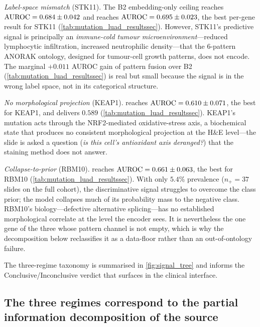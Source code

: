 \emph{Label-space mismatch} (STK11).
The B2 embedding-only ceiling reaches
$\text{AUROC} = 0.684 \pm 0.042$ and \piabmil{} reaches
$\text{AUROC} = 0.695 \pm 0.023$, the best per-gene result for STK11
(\cref{tab:mutation_luad_resultssec}).
However, STK11's predictive signal is principally an
\emph{immune-cold tumour microenvironment}---reduced lymphocytic
infiltration, increased neutrophilic
density\cite{skoulidis2018stk11pd1,pineda2025stk11morphology}---that
the 6-pattern ANORAK ontology, designed for tumour-cell growth
patterns, does not encode.
The marginal $+0.011$ AUROC gain of pattern fusion over B2
(\cref{tab:mutation_luad_resultssec}) is real but
small because the signal is in the wrong label space, not in
its categorical structure.

\emph{No morphological projection} (KEAP1).
\piabmil{} reaches $\text{AUROC} = 0.610 \pm 0.071$, the best for KEAP1,
and \fcmil{} delivers $0.589$ (\cref{tab:mutation_luad_resultssec}).
KEAP1's mutation acts through the NRF2-mediated oxidative-stress
axis,\cite{li2011keap1papillary} a biochemical state that produces
no consistent morphological projection at the H\&E level---the
slide is asked a question (\emph{is this cell's antioxidant axis
deranged?}) that the staining method does not answer.

\emph{Collapse-to-prior} (RBM10).
\fcmil{} reaches $\text{AUROC} = 0.661 \pm 0.063$, the best for RBM10
(\cref{tab:mutation_luad_resultssec}).
With only $5.4\%$ prevalence ($n_+ = 37$ slides on the full
cohort), the discriminative signal struggles to overcome the
class prior; the model collapses much of its probability mass
to the negative class.\cite{bowman2016posteriorcollapse}
RBM10's biology---defective alternative
splicing\cite{bechara2013rbm10,cao2024rbm10egfr}---has no
established morphological correlate at the level the encoder sees.
It is nevertheless the one gene of the three whose pattern channel is
not empty, which is why the decomposition below reclassifies it as a
data-floor rather than an out-of-ontology failure.

The three-regime taxonomy is summarised in
\cref{fig:signal_tree} and informs the Conclusive/Inconclusive
verdict that \lchai{} surfaces in the clinical interface.

\subsection*{The three regimes correspond to the partial information
decomposition of the source}

